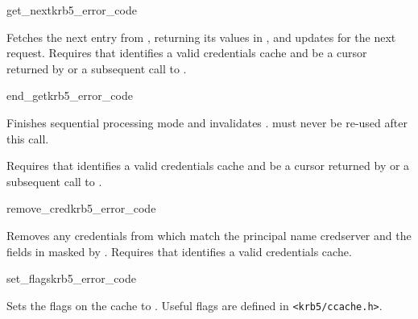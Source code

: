 \begin{funcdecl}{get_next}{krb5_error_code}{\funcin}
\funcout
{}
\funcinout
{}
\end{funcdecl}

Fetches the next entry from , returning its values in
, and updates  for the next request.
Requires that  identifies a valid credentials cache and
 be a cursor returned by
 or a subsequent call to
.


\begin{funcdecl}{end_get}{krb5_error_code}{\funcin}
\end{funcdecl}

Finishes sequential processing mode and invalidates .
 must never be re-used after this call.

Requires that  identifies a valid credentials cache and
 be a cursor returned by
 or a subsequent call to
.



\begin{funcdecl}{remove_cred}{krb5_error_code}{\funcin}
\end{funcdecl}

Removes any credentials from  which match the principal
name {cred{\ptsto}server} and the fields in  masked by
.
Requires that  identifies a valid credentials cache.


\begin{funcdecl}{set_flags}{krb5_error_code}{\funcin}
\end{funcdecl}

Sets the flags on the cache  to .  Useful
flags are defined in {\tt <krb5/ccache.h>}.


